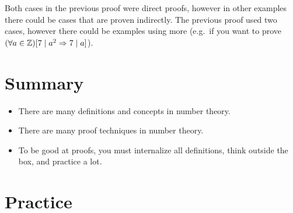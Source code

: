 \documentclass[main.tex]{subfiles}
\begin{document}

\begin{rem}
	Both cases in the previous proof were direct proofs, however in other examples there could be cases that are proven indirectly. The previous proof used two cases, however there could be examples using more (e.g.\ if you want to prove \((\forall a \in \mathbb{Z})[7 \mid a^2 \Rightarrow 7 \mid a]\)).
\end{rem}

\section{Summary}

\begin{itemize}
	\item There are many definitions and concepts in number theory.
	\item There are many proof techniques in number theory.
	\item To be good at proofs, you must internalize all definitions, think outside the box, and practice a lot.
\end{itemize}

\section{Practice}
\end{document}
